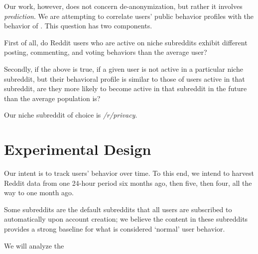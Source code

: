 \documentclass[10pt]{article}
\begin{document}
Our work, however, does not concern de-anonymization, but rather it involves \textit{prediction}. We are attempting to correlate users' public behavior profiles with the behavior of . This question has two components.

First of all, do Reddit users who are active on niche subreddits exhibit different posting, commenting, and voting behaviors than the average user?

Secondly, if the above is true, if a given user is not active in a particular niche subreddit, but their behavioral profile is similar to those of users active in that subreddit, are they more likely to become active in that subreddit in the future than the average population is?

Our niche subreddit of choice is \textit{/r/privacy}.

\section{Experimental Design}

Our intent is to track users' behavior over time. To this end, we intend to harvest Reddit data from one 24-hour period six months ago, then five, then four, all the way to one month ago.

Some subreddits are the default subreddits that all users are subscribed to automatically upon account creation; we believe the content in these subreddits provides a strong baseline for what is considered `normal' user behavior.

We will analyze the 



\end{document}
